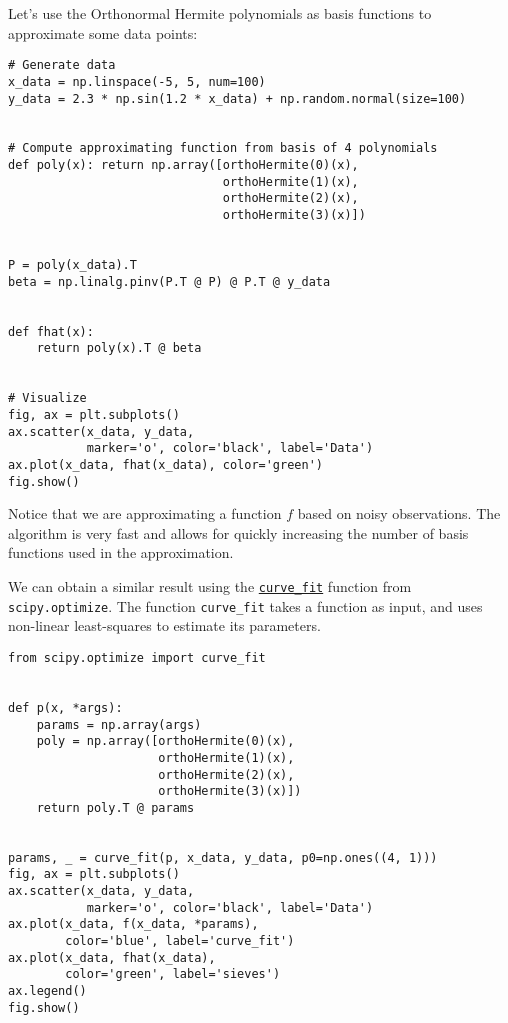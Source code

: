 \documentclass[12pt, a4paper]{article}
\begin{document}
Let's use the Orthonormal Hermite polynomials as basis functions to approximate some data points:
\lstset{language=jupyter-python,label= ,caption= ,captionpos=b,numbers=none}
\begin{lstlisting}
# Generate data
x_data = np.linspace(-5, 5, num=100)
y_data = 2.3 * np.sin(1.2 * x_data) + np.random.normal(size=100)


# Compute approximating function from basis of 4 polynomials
def poly(x): return np.array([orthoHermite(0)(x),
                              orthoHermite(1)(x),
                              orthoHermite(2)(x),
                              orthoHermite(3)(x)])


P = poly(x_data).T
beta = np.linalg.pinv(P.T @ P) @ P.T @ y_data


def fhat(x):
    return poly(x).T @ beta


# Visualize
fig, ax = plt.subplots()
ax.scatter(x_data, y_data,
           marker='o', color='black', label='Data')
ax.plot(x_data, fhat(x_data), color='green')
fig.show()
\end{lstlisting}

Notice that we are approximating a function \(f\) based on noisy observations.
The algorithm is very fast and allows for quickly increasing the number of basis functions used in the approximation.

We can obtain a similar result using the \href{https://docs.scipy.org/doc/scipy/reference/generated/scipy.optimize.curve\_fit.html\#scipy-optimize-curve-fit}{\texttt{curve\_fit}} function from \texttt{scipy.optimize}.
The function \texttt{curve\_fit} takes a function as input, and uses non-linear least-squares to estimate its parameters.
\lstset{language=jupyter-python,label= ,caption= ,captionpos=b,numbers=none}
\begin{lstlisting}
from scipy.optimize import curve_fit


def p(x, *args):
    params = np.array(args)
    poly = np.array([orthoHermite(0)(x),
                     orthoHermite(1)(x),
                     orthoHermite(2)(x),
                     orthoHermite(3)(x)])
    return poly.T @ params


params, _ = curve_fit(p, x_data, y_data, p0=np.ones((4, 1)))
fig, ax = plt.subplots()
ax.scatter(x_data, y_data,
           marker='o', color='black', label='Data')
ax.plot(x_data, f(x_data, *params),
        color='blue', label='curve_fit')
ax.plot(x_data, fhat(x_data),
        color='green', label='sieves')
ax.legend()
fig.show()
\end{lstlisting}
\end{document}
